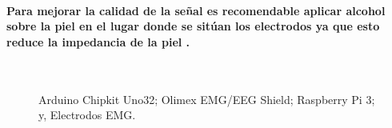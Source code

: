 \documentclass{article}
\begin{document}
\paragraph{
Para mejorar la calidad de la señal es recomendable aplicar alcohol sobre la piel en el lugar donde se sitúan los electrodos ya que esto reduce la impedancia de la piel
\cite{sanei2007}.}

\begin{figure}[ht]%
\centering
{}%
\hspace{8pt}%
 \\
%
\hspace{8pt}%
%
\caption[]{
 Arduino Chipkit Uno32;
 Olimex EMG/EEG Shield;
 Raspberry Pi 3; y,
 Electrodos EMG.}%
\label{fig:ex3}%
\end{figure}
\end{document}
